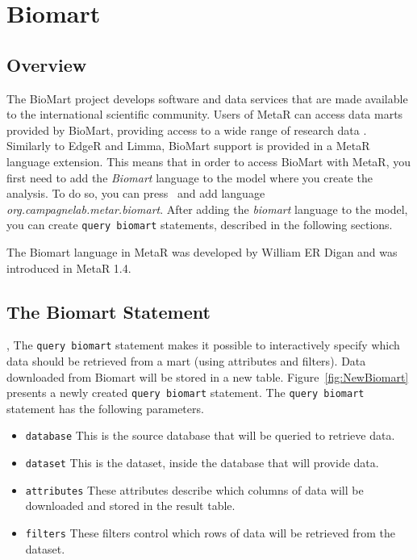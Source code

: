 

\chapter{Biomart}\label{chap:Biomart}

\section{Overview}

The BioMart project develops software and data services that are made available to the international scientific community. Users of MetaR can access data marts provided by BioMart, providing access to a wide range of research data . Similarly to EdgeR and Limma, BioMart support is provided in a MetaR language extension. This means that in order to access BioMart with MetaR, you first need to add the \textit{Biomart} language to the model where you create the analysis. To do so, you can press~ and add language \textit{org\allowbreak.campagnelab\allowbreak.metar\allowbreak.biomart}. After adding the \textit{biomart} language to the model, you can create \texttt{query biomart} statements, described in the following sections. 
\begin{remark}
The Biomart language in MetaR was developed by William ER Digan and was introduced in MetaR 1.4.
\end{remark}

\section{The Biomart Statement},
The \texttt{query biomart} statement makes it possible to interactively specify which data should be retrieved from a mart (using attributes and filters). Data downloaded from Biomart will be stored in a new table. Figure~\ref{fig:NewBiomart} presents a newly created \texttt{query biomart} statement.
The \texttt{query biomart} statement has the following parameters.
\begin{itemize}
\item \texttt{database} This is the source database that will be queried to retrieve data.
\item \texttt{dataset} This is the dataset, inside the database that will provide data.
\item \texttt{attributes} These attributes describe which columns of data will be downloaded and stored in the result table.
\item \texttt{filters} These filters control which rows of data will be retrieved from the dataset.

\end{itemize} 

